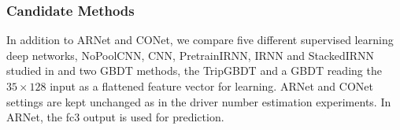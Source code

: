 \documentclass{article}
\begin{document}
\subsubsection{Candidate Methods}
In addition to ARNet and CONet, %
we compare five different supervised learning deep networks, NoPoolCNN, CNN, PretrainIRNN, IRNN and StackedIRNN studied in \cite{dong2016characterizing} and two GBDT methods, the TripGBDT and a GBDT reading the $35\times 128$ input as a flattened feature vector for learning. %
ARNet and CONet settings are kept unchanged as in the driver number estimation experiments.
In ARNet, the fc3 output is used for prediction.
\end{document}
